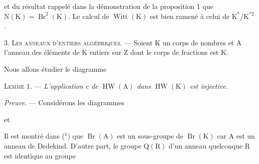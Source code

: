 et du résultat rappelé dans la démonstration de la proposition 1 que $\mathrm N(\mathrm K)=\operatorname{Br}^2(\mathrm K)$.
Le calcul de $\operatorname{Witt}(\mathrm K)$ est bien ramené à celui de $\mathrm K^*/\mathrm K^{*2}$.

3. \textsc{Les anneaux d'entiers algébriques}. — Soient K un corps de nombres et A l'anneau
des éléments de K entiers sur Z dont le corps de fractions est K.

Nous allons étudier le diagramme


\textsc{Lemme 1}. — \emph{L'application $c$ de $\operatorname{HW}(\mathrm A)$ dans $\operatorname{HW}(\mathrm K)$ est injective.}

\emph{Preuve}. — Considérons les diagrammes


et


Il est montré dans (${}^1$) que $\operatorname{Br}(\mathrm A)$ est un sous-groupe de $\operatorname{Br}(\mathrm K)$ car A est un anneau de
Dedekind. D'autre part, le groupe $\mathrm Q(\mathrm R)$ d'un anneau quelconque R est identique au groupe


